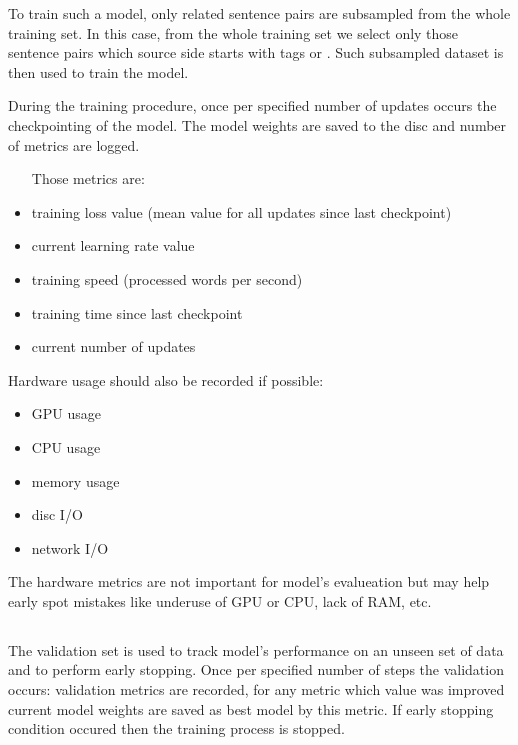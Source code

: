 To train such a model, only related sentence pairs are subsampled
from the whole training set.
In this case, from the whole training set we select only those sentence
pairs which source side starts with tags  or .
Such subsampled dataset is then used to train the model.

During the training procedure, once per specified number of updates
occurs the checkpointing of the model.
The model weights are saved to the disc and number of metrics are logged.

\begin{samepage}
\begin{itemize}
	\item [Those metrics are:]
	\item training loss value (mean value for all updates since
	last checkpoint)
	\item current learning rate value
	\item training speed (processed words per second)
	\item training time since last checkpoint
	\item current number of updates
\end{itemize}
\end{samepage}
\begin{samepage}
Hardware usage should also be recorded if possible:
\begin{itemize}
	\item GPU usage
	\item CPU usage
	\item memory usage
	\item disc I/O
	\item network I/O
\end{itemize}
\end{samepage}

The hardware metrics are not important for model's evalueation
but may help early spot mistakes like underuse of GPU or CPU, lack of RAM, etc.

\subsection{}
\label{subsection:validation}

The validation set is used to track model's performance
on an unseen set of data and to perform early stopping.
Once per specified number of steps the validation occurs:
validation metrics are recorded, for any metric which value was
improved current model weights are saved as best model by this metric.
If early stopping condition occured then the training process is stopped.

